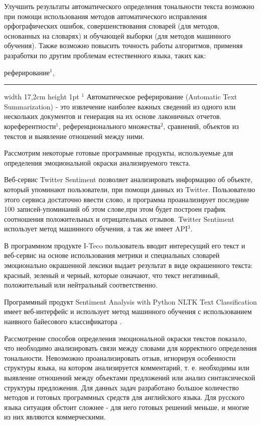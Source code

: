 \documentclass[14pt,a4paper]{scrartcl}
\begin{document}
Улучшить результаты автоматического определения тональности текста возможно при помощи использования методов автоматического исправления орфографических ошибок, совершенствования словарей (для методов, основанных на словарях) и обучающей выборки (для методов машинного обучения). Также возможно повысить точность работы алгоритмов, применяя разработки по другим проблемам естественного языка, таких как:
\begin{itemize}
 реферирование$^1$,
\medskip
\hrule width 17,2cm height 1pt
\medskip$^1$ Автоматическое реферирование (Automatic Text Summarization) - это извлечение наиболее важных сведений из одного или нескольких документов и генерация на их основе лаконичных отчетов.
\newpage
{} кореферентности$^1$, референционального множества$^2$,
 сравнений,
 объектов из текстов и выявление отношений между ними.
\end{itemize}

Рассмотрим некоторые готовые программные продукты, используемые для определения эмоциональной окраски анализируемого текста.

Веб-сервис Twitter Sentiment \cite{3} позволяет анализировать информацию	об объекте, который упоминают	пользователи, при помощи данных из Twitter. Пользователю этого сервиса достаточно ввести слово, и программа проанализирует последние 100 записей-упоминаний об этом слове,при этом будет построен график соотношения положительных и отрицательных отзывов. Twitter Sentiment использует метод машинного обучения, а так же имеет API$^3$.

В программном продукте I-Teco \cite{4} пользователь вводит интересущий его текст и веб-сервис на основе использования метрики и специальных словарей эмоционально окрашенной лексики выдает результат в виде окрашенного текста: красный, зеленый и черный, которые означают, что текст негативный, положительный или нейтральный соответственно.

Программный продукт Sentiment Analysis with Python NLTK Text Classifica\-tion имеет веб-интерфейс \cite{5} и использует метод машинного обучения с использованием наивного байесового классификатора \cite{6}.

Рассмотрение способов определения эмоциональной окраски текстов показало, что необходимо анализировать связи между словами для корректного определения тональности. Невозможно проанализировать отзыв, игнорируя особенности структуры языка, на котором анализируется комментарий, т. е. необходимы или выявление отношений между объектами предложений или анализ синтаксической структуры предложения. Для данных задач разработано большое количество методов и готовых программных средств для английского языка. Для русского языка ситуация обстоит сложнее - для него готовых решений меньше, и многие из них являются коммерческими.
\bigskip
\end{document}
